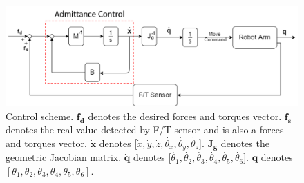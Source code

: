 \label{sec:adm ctrl}
\begin{figure}[htbp]
\begin{center}
\includegraphics[width=1\linewidth]{Images/adm ctrl.png}
\end{center}
\caption{
Control scheme. $\boldsymbol{f_d}$ denotes the desired forces and torques vector. $\boldsymbol{f_s}$ denotes the real value detected by F/T sensor and is also a forces and torques vector. $\boldsymbol{\dot{x}}$ denotes [$\dot{x}, \dot{y}, \dot{z}, \dot{\theta _x}, \dot{\theta _y}, \dot{\theta _z}$]. $\mathbf{J_g}$ denotes the geometric Jacobian matrix. $\boldsymbol{\dot{q}}$ denotes [$\dot{\theta _1}, \dot{\theta _2}, \dot{\theta _3}, \dot{\theta _4}, \dot{\theta _5}, \dot{\theta _6}$]. $\boldsymbol{q}$ denotes $\left[\theta _1, \theta _2, \theta _3, \theta _4, \theta _5, \theta _6 \right] $.
}\label{fig:adm ctrl}
\end{figure}

